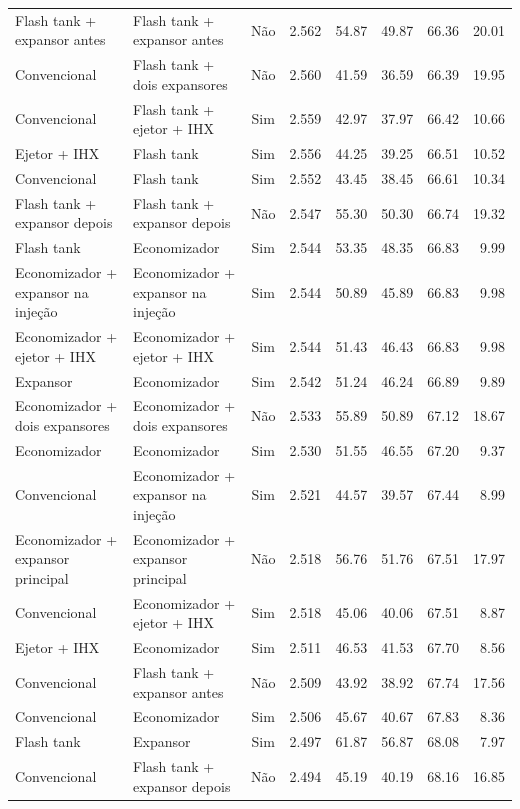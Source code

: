 {\begin{tabular}{llcrrrrr}
Flash tank + expansor antes & Flash tank + expansor antes & Não & 2.562 & 54.87 & 49.87 & 66.36 & 20.01 \\
Convencional & Flash tank + dois expansores & Não & 2.560 & 41.59 & 36.59 & 66.39 & 19.95 \\
Convencional & Flash tank + ejetor + IHX & Sim & 2.559 & 42.97 & 37.97 & 66.42 & 10.66 \\
Ejetor + IHX & Flash tank & Sim & 2.556 & 44.25 & 39.25 & 66.51 & 10.52 \\
Convencional & Flash tank & Sim & 2.552 & 43.45 & 38.45 & 66.61 & 10.34 \\
Flash tank + expansor depois & Flash tank + expansor depois & Não & 2.547 & 55.30 & 50.30 & 66.74 & 19.32 \\
Flash tank & Economizador & Sim & 2.544 & 53.35 & 48.35 & 66.83 & 9.99 \\
Economizador + expansor na injeção & Economizador + expansor na injeção & Sim & 2.544 & 50.89 & 45.89 & 66.83 & 9.98 \\
Economizador + ejetor + IHX & Economizador + ejetor + IHX & Sim & 2.544 & 51.43 & 46.43 & 66.83 & 9.98 \\
Expansor & Economizador & Sim & 2.542 & 51.24 & 46.24 & 66.89 & 9.89 \\
Economizador + dois expansores & Economizador + dois expansores & Não & 2.533 & 55.89 & 50.89 & 67.12 & 18.67 \\
Economizador & Economizador & Sim & 2.530 & 51.55 & 46.55 & 67.20 & 9.37 \\
Convencional & Economizador + expansor na injeção & Sim & 2.521 & 44.57 & 39.57 & 67.44 & 8.99 \\
Economizador + expansor principal & Economizador + expansor principal & Não & 2.518 & 56.76 & 51.76 & 67.51 & 17.97 \\
Convencional & Economizador + ejetor + IHX & Sim & 2.518 & 45.06 & 40.06 & 67.51 & 8.87 \\
Ejetor + IHX & Economizador & Sim & 2.511 & 46.53 & 41.53 & 67.70 & 8.56 \\
Convencional & Flash tank + expansor antes & Não & 2.509 & 43.92 & 38.92 & 67.74 & 17.56 \\
Convencional & Economizador & Sim & 2.506 & 45.67 & 40.67 & 67.83 & 8.36 \\
Flash tank & Expansor & Sim & 2.497 & 61.87 & 56.87 & 68.08 & 7.97 \\
Convencional & Flash tank + expansor depois & Não & 2.494 & 45.19 & 40.19 & 68.16 & 16.85 \\

\end{tabular}}
